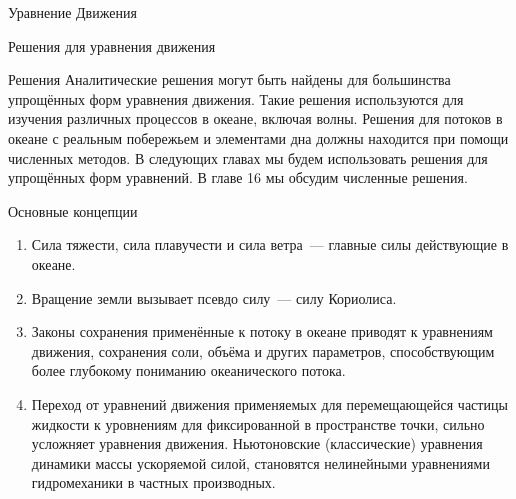\begin{chapter}{Уравнение Движения}
\begin{section}{Решения для уравнения движения}
\begin{paragraph}{Решения}
Аналитические решения могут быть найдены для большинства упрощённых
форм уравнения движения. Такие решения используются для изучения
различных процессов в океане, включая волны. Решения для потоков в
океане с реальным побережьем и элементами дна должны находится при
помощи численных методов. В следующих главах мы будем использовать
решения для упрощённых форм уравнений. В главе 16 мы обсудим численные
решения.
%
\end{paragraph}
\end{section}

\begin{section}{Основные концепции}
\begin{enumerate}
\item
Сила тяжести, сила плавучести и сила ветра~--- главные силы
действующие в океане.
%

\item
Вращение земли вызывает псевдо силу~--- силу Кориолиса.
%

\item
Законы сохранения применённые к потоку в океане приводят к уравнениям
движения, сохранения соли, объёма и других параметров, способствующим
более глубокому пониманию океанического потока.
%

\item
Переход от уравнений движения применяемых для перемещающейся частицы
жидкости к уровнениям для фиксированной в пространстве точки, сильно
усложняет уравнения движения. Ньютоновские (классические) уравнения
динамики массы ускоряемой силой, становятся нелинейными уравнениями
гидромеханики в частных производных.
%


\end{enumerate}
\end{section}
\end{chapter}
